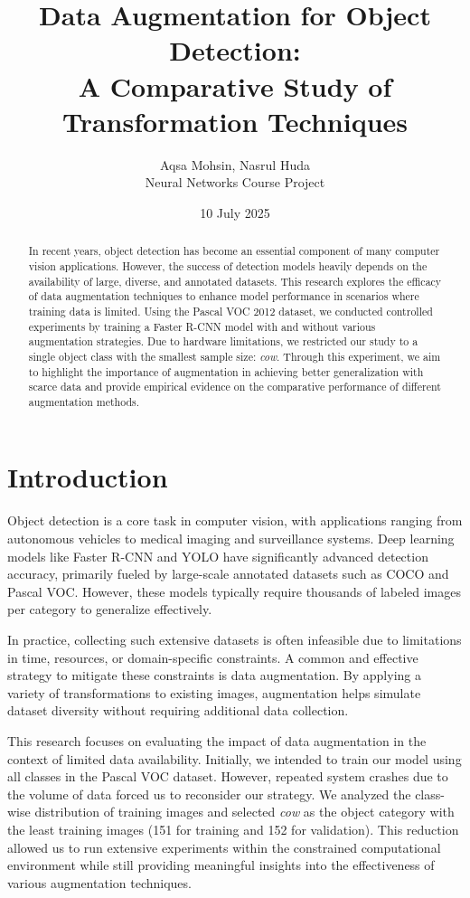 \documentclass[12pt]{article}
\title{Data Augmentation for Object Detection: \\ A Comparative Study of Transformation Techniques}
\author{Aqsa Mohsin, Nasrul Huda \\ Neural Networks Course Project}
\date{10 July 2025}
\begin{document}
\maketitle

\begin{abstract}
In recent years, object detection has become an essential component of many computer vision applications. However, the success of detection models heavily depends on the availability of large, diverse, and annotated datasets. This research explores the efficacy of data augmentation techniques to enhance model performance in scenarios where training data is limited. Using the Pascal VOC 2012 dataset, we conducted controlled experiments by training a Faster R-CNN model with and without various augmentation strategies. Due to hardware limitations, we restricted our study to a single object class with the smallest sample size: \emph{cow}. Through this experiment, we aim to highlight the importance of augmentation in achieving better generalization with scarce data and provide empirical evidence on the comparative performance of different augmentation methods.
\end{abstract}

\section{Introduction}
Object detection is a core task in computer vision, with applications ranging from autonomous vehicles to medical imaging and surveillance systems. Deep learning models like Faster R-CNN and YOLO have significantly advanced detection accuracy, primarily fueled by large-scale annotated datasets such as COCO and Pascal VOC. However, these models typically require thousands of labeled images per category to generalize effectively.

In practice, collecting such extensive datasets is often infeasible due to limitations in time, resources, or domain-specific constraints. A common and effective strategy to mitigate these constraints is data augmentation. By applying a variety of transformations to existing images, augmentation helps simulate dataset diversity without requiring additional data collection.

This research focuses on evaluating the impact of data augmentation in the context of limited data availability. Initially, we intended to train our model using all classes in the Pascal VOC dataset. However, repeated system crashes due to the volume of data forced us to reconsider our strategy. We analyzed the class-wise distribution of training images and selected \emph{cow} as the object category with the least training images (151 for training and 152 for validation). This reduction allowed us to run extensive experiments within the constrained computational environment while still providing meaningful insights into the effectiveness of various augmentation techniques.
\end{document}
